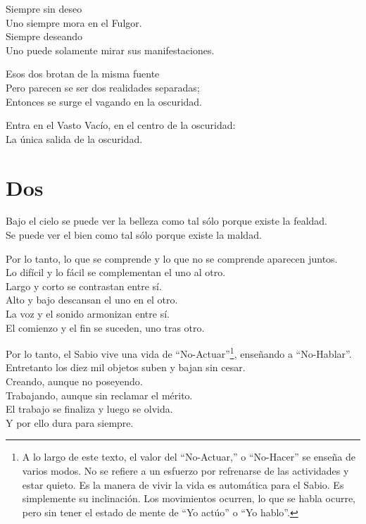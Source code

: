 \documentclass[book,b5paper,hidelinks,final]{memoir}
\begin{document}
	Siempre sin deseo\\
	Uno siempre mora en el Fulgor.\\
	Siempre deseando\\
	Uno puede solamente mirar sus manifestaciones.
	
	Esos dos brotan de la misma fuente\\
	Pero parecen se ser dos realidades separadas;\\
	Entonces se surge el vagando en la oscuridad.
	
	Entra en el Vasto Vacío, en el centro de la oscuridad:\\
	La única salida de la oscuridad.
	
	\chapter*{Dos}
	
	Bajo el cielo se puede ver la belleza como tal sólo porque existe la
	fealdad.\\
	Se puede ver el bien como tal sólo porque existe la maldad.
	
	Por lo tanto, lo que se comprende y lo que no se comprende aparecen
	juntos.\\
	Lo difícil y lo fácil se complementan el uno al otro.\\
	Largo y corto se contrastan entre sí.\\
	Alto y bajo descansan el uno en el otro.\\
	La voz y el sonido armonizan entre sí.\\
	El comienzo y el fin se suceden, uno tras otro.
	
	Por lo tanto, el Sabio vive una vida de ``No-Actuar''\footnote{A lo largo de este texto, el valor del ``No-Actuar,'' o ``No-Hacer'' se
		enseña de varios modos. No se refiere a un esfuerzo por refrenarse de
		las actividades y estar quieto. Es la manera de vivir la vida es
		automática para el Sabio. Es simplemente su inclinación. Los movimientos
		ocurren, lo que se habla ocurre, pero sin tener el estado de mente de
		``Yo actúo'' o ``Yo hablo''.}, enseñando a
	``No-Hablar''.\\
	Entretanto los diez mil objetos suben y bajan sin cesar.\\
	Creando, aunque no poseyendo.\\
	Trabajando, aunque sin reclamar el mérito.\\
	El trabajo se finaliza y luego se olvida.\\
	Y por ello dura para siempre.
	
\end{document}
